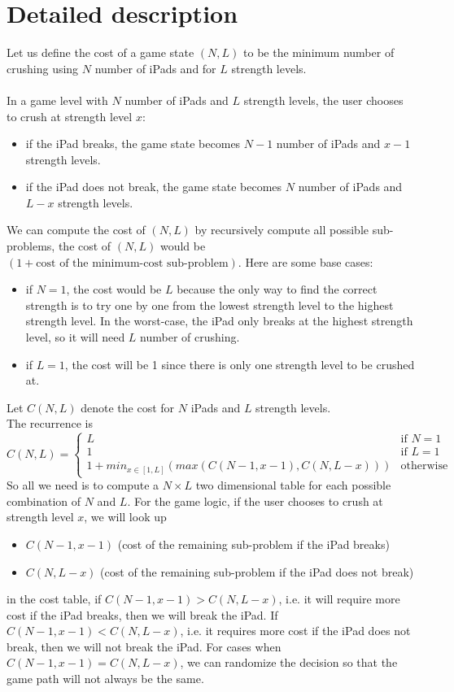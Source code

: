 \documentclass[12pt,a4paper,oneside]{report}
\begin{document}
\section{Detailed description}
Let us define the cost of a game state $(N, L)$ to be the minimum number of crushing using $N$ number of iPads and for $L$ strength levels. \\\\
In a game level with $N$ number of iPads and $L$ strength levels, the user chooses to crush at strength level $x$:
\begin{itemize}
\item if the iPad breaks, the game state becomes $N - 1$ number of iPads and $x - 1$ strength levels.
\item if the iPad does not break, the game state becomes $N$ number of iPads and $L - x$ strength levels.
\end{itemize}
We can compute the cost of $(N, L)$ by recursively compute all possible sub-problems, the cost of $(N, L)$ would be $(1 + \text{cost of the minimum-cost sub-problem})$. Here are some base cases:
\begin{itemize}
\item if $N = 1$, the cost would be $L$ because the only way to find the correct strength is to try one by one from the lowest strength level to the highest strength level. In the worst-case, the iPad only breaks at the highest strength level, so it will need $L$ number of crushing.
\item if $L = 1$, the cost will be 1 since there is only one strength level to be crushed at.
\end{itemize}
Let $C(N, L)$ denote the cost for $N$ iPads and $L$ strength levels. \\
The recurrence is
\[
C(N, L) = 
\begin{cases}
L & \text{if $N = 1$} \\
1 & \text{if $L = 1$} \\
1 + min_{x \in [1, L]}(max(C(N - 1, x - 1), C(N, L - x))) & \text{otherwise}
\end{cases}
\]
So all we need is to compute a $N \times L$ two dimensional table for each possible combination of $N$ and $L$. For the game logic, if the user chooses to crush at strength level $x$, we will look up 
\begin{itemize}
\item $C(N - 1, x - 1)$ (cost of the remaining sub-problem if the iPad breaks)
\item $C(N, L - x)$ (cost of the remaining sub-problem if the iPad does not break)
\end{itemize}
in the cost table, if $C(N - 1, x - 1) > C(N, L - x)$, i.e. it will require more cost if the iPad breaks, then we will break the iPad. If $C(N - 1, x - 1) < C(N, L - x)$, i.e. it requires more cost if the iPad does not break, then we will not break the iPad. For cases when $C(N - 1, x - 1) = C(N, L - x)$, we can randomize the decision so that the game path will not always be the same.
\end{document}

